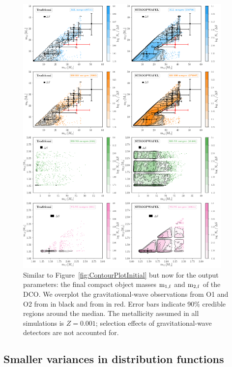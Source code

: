 \documentclass[a4paper,fleqn,usenatbib,useAMS,usedcolumn]{mnras}
\begin{document}
%
\begin{figure}
	\includegraphics[width=0.95\textwidth]{OnlyContourPlotFinalM1M2.pdf}
    \caption{Similar to Figure~\ref{fig:ContourPlotInitial} but now for the output parameters: the final compact object masses $\rm{m_{\rm{1,f}}}$ and $\rm{m_{\rm{2,f}}}$ of the DCO.  We overplot the gravitational-wave observations from  O1 and O2  from \citet{2018arXiv181112907T} in black and  from \citet{2019arXiv190210331Z} in red. Error bars indicate 90$\%$ credible regions around the median.  The metallicity assumed in all simulations is $Z = 0.001$; selection effects of gravitational-wave detectors are not accounted for.}
    \label{fig:ContourPlotFinal}
\end{figure}


\subsection{Smaller variances in distribution functions}
\label{subsec:showcaseBHNS-smallerVariance}
\end{document}

